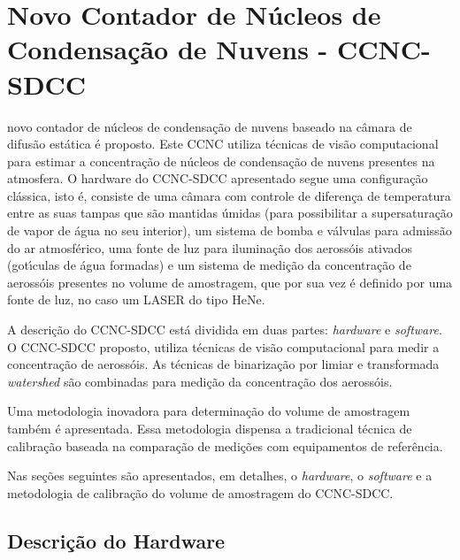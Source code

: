 \doublespacing
\chapter{Novo Contador de N\'{u}cleos de Condensa\c{c}\~{a}o de Nuvens  - CCNC-SDCC }
\label{cap:metodologia}

 novo contador de n\'{u}cleos de condensa\c{c}\~{a}o de nuvens baseado na c\^{a}mara de difus\~{a}o est\'{a}tica \'{e} proposto. Este  CCNC utiliza t\'{e}cnicas de vis\~{a}o computacional para estimar a concentra\c{c}\~{a}o de n\'{u}cleos de condensa\c{c}\~{a}o de nuvens presentes na atmosfera. O hardware do CCNC-SDCC apresentado segue uma configura\c{c}\~{a}o cl\'{a}ssica, isto \'{e}, consiste de uma c\^{a}mara com controle de diferen\c{c}a de temperatura entre as suas tampas que s\~{a}o mantidas \'{u}midas (para possibilitar a supersatura\c{c}\~{a}o de vapor de \'{a}gua no seu interior), um sistema de bomba e v\'{a}lvulas para admiss\~{a}o do ar atmosf\'{e}rico, uma fonte de luz para ilumina\c{c}\~{a}o dos aeross\'{o}is ativados (got\'{\i}culas de \'{a}gua formadas) e um sistema de medi\c{c}\~{a}o da concentra\c{c}\~{a}o de aeross\'{o}is presentes no volume de amostragem, que por sua vez \'{e} definido por uma fonte de luz, no caso um LASER do tipo HeNe.

A descri\c{c}\~{a}o do CCNC-SDCC est\'{a} dividida em duas partes: \emph{hardware} e \emph{software}. O CCNC-SDCC proposto, utiliza t\'{e}cnicas de vis\~{a}o computacional para medir a concentra\c{c}\~{a}o de aeross\'{o}is. As t\'{e}cnicas de binariza\c{c}\~{a}o por limiar e transformada \emph{watershed} s\~{a}o combinadas para medi\c{c}\~{a}o da concentra\c{c}\~{a}o dos aeross\'{o}is.

Uma metodologia inovadora para determina\c{c}\~{a}o do volume de amostragem tamb\'{e}m \'{e} apresentada. Essa metodologia dispensa a tradicional t\'{e}cnica de calibra\c{c}\~{a}o baseada na compara\c{c}\~{a}o de medi\c{c}\~{o}es com equipamentos de refer\^{e}ncia.

Nas se\c{c}\~{o}es seguintes s\~{a}o apresentados, em detalhes, o \emph{hardware}, o \emph{software}  e a metodologia de calibra\c{c}\~{a}o do volume de amostragem do CCNC-SDCC.

\section{Descri\c{c}\~{a}o do Hardware}

